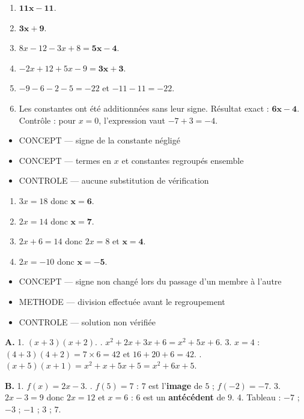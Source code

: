 \documentclass[10pt,a4paper]{article}
\begin{document}
\begin{enumerate}
\item $\mathbf{11x-11}$.
\item $\mathbf{3x+9}$.
\item $8x-12-3x+8=\mathbf{5x-4}$.
\item $-2x+12+5x-9=\mathbf{3x+3}$.
\item $-9-6-2-5=-22$ et $-11-11=-22$.
\item Les constantes ont été additionnées sans leur signe. Résultat exact : $\mathbf{6x-4}$. Contrôle : pour $x=0$, l'expression vaut $-7+3=-4$.
\end{enumerate}
\begin{itemize}
\item \textsc{CONCEPT} --- signe de la constante négligé
\item \textsc{CONCEPT} --- termes en $x$ et constantes regroupés ensemble
\item \textsc{CONTROLE} --- aucune substitution de vérification
\end{itemize}
\begin{enumerate}
\item $3x=18$ donc $\mathbf{x=6}$.
\item $2x=14$ donc $\mathbf{x=7}$.
\item $2x+6=14$ donc $2x=8$ et $\mathbf{x=4}$.
\item $2x=-10$ donc $\mathbf{x=-5}$.
\end{enumerate}
\begin{itemize}
\item \textsc{CONCEPT} --- signe non changé lors du passage d'un membre à l'autre
\item \textsc{METHODE} --- division effectuée avant le regroupement
\item \textsc{CONTROLE} --- solution non vérifiée
\end{itemize}

\textbf{A.} 1. $(x+3)(x+2)$. . $x^2 + 2x + 3x + 6 = x^2 + 5x + 6$.
3. $x=4$ : $(4+3)(4+2)=7\times 6=42$ et $16+20+6=42$. . $(x+5)(x+1)=x^2+x+5x+5=x^2+6x+5$.

\textbf{B.} 1. $f(x)=2x-3$. . $f(5)=7$ : $7$ est l'\textbf{image} de $5$ ; $f(-2)=-7$.
3. $2x-3=9$ donc $2x=12$ et $x=6$ : $6$ est un \textbf{antécédent} de $9$.
4. Tableau : $-7$ ; $-3$ ; $-1$ ; $3$ ; $7$.
\end{document}
